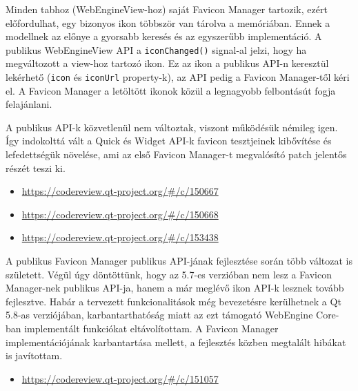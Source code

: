 \documentclass[12pt]{report}
\let\origurl\url
\renewcommand{\url}[1]{%
    \textcolor{blue}{\origurl{#1}}
}
\newcommand{\gerrit}[1]{%
    \textcolor{qtgreen}{\origurl{https://codereview.qt-project.org/\#/c/#1}}
}
\begin{document}
Minden tabhoz (WebEngineView-hoz) saját Favicon Manager tartozik, ezért előfordulhat, egy
bizonyos ikon többször van tárolva a memóriában. Ennek a modellnek az előnye a gyorsabb
keresés és az egyszerűbb implementáció. A publikus WebEngineView API a
\texttt{iconChanged()} signal-al jelzi, hogy ha megváltozott a view-hoz tartozó ikon.
Ez az ikon a publikus API-n keresztül lekérhető (\texttt{icon} és \texttt{iconUrl}
property-k), az API pedig a Favicon Manager-től kéri el.
A Favicon Manager a letöltött ikonok közül a legnagyobb felbontásút fogja felajánlani.

A publikus API-k közvetlenül nem változtak, viszont működésük némileg igen. Így indokolttá
vált a Quick és Widget API-k favicon tesztjeinek kibővítése és lefedettségük növelése, ami
az első Favicon Manager-t megvalósító patch jelentős részét teszi ki.

\begin{center}
    \begin{reviewbox}
        \begin{itemize}
            \renewcommand{\labelitemi}{\textcolor{qtgreen}{$\blacktriangleright$}}
            \item \gerrit{150667}
            \item \gerrit{150668}
            \item \gerrit{153438}
        \end{itemize}
    \end{reviewbox}
\end{center}

A publikus Favicon Manager publikus API-jának fejlesztése során több változat is született.
Végül úgy döntöttünk, hogy az 5.7-es verzióban nem lesz a Favicon Manager-nek publikus
API-ja, hanem a már meglévő ikon API-k lesznek tovább fejlesztve. Habár a tervezett
funkcionalitások még bevezetésre kerülhetnek a Qt 5.8-as verziójában, karbantarthatóság
miatt az ezt támogató WebEngine Core-ban implementált funkciókat eltávolítottam.
A Favicon Manager implementációjának karbantartása mellett, a fejlesztés közben megtalált
hibákat is javítottam.

\begin{center}
    \begin{reviewbox}
        \begin{itemize}
            \renewcommand{\labelitemi}{\textcolor{qtgreen}{$\blacktriangleright$}}
            \item \gerrit{151057}
        \end{itemize}
    \end{reviewbox}
\end{center}
\end{document}
